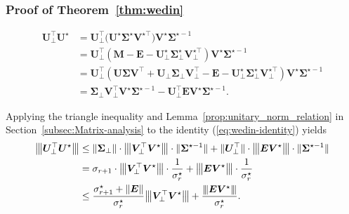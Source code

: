 \documentclass[compress,
mathserif,wide,%
]{beamer}
\begin{document}
\begin{frame}
	\frametitle{Proof of Theorem~\ref{thm:wedin}}
	
	
	\begin{align}
\bm{U}_{\perp}^{\top}\bm{U}^{\star}
	& =\bm{U}_{\perp}^{\top}\big(\bm{U}^{\star}\bm{\Sigma}^{\star}\bm{V}^{\star\top}\big)\bm{V}^{\star}\bm{\Sigma}^{\star-1}\nonumber \\
	& =\bm{U}_{\perp}^{\top}\left(\bm{M}-\bm{E}-\bm{U}_{\perp}^{\star}\bm{\Sigma}_{\perp}^{\star}\bm{V}_{\perp}^{\star\top}\right)\bm{V}^{\star}\bm{\Sigma}^{\star-1}\nonumber \\
 & =\bm{U}_{\perp}^{\top}\left(\bm{U}\bm{\Sigma}\bm{V}^{\top}+\bm{U}_{\perp}\bm{\Sigma}_{\perp}\bm{V}_{\perp}^{\top}-\bm{E}-\bm{U}_{\perp}^{\star}\bm{\Sigma}_{\perp}^{\star}\bm{V}_{\perp}^{\star\top}\right)\bm{V}^{\star}\bm{\Sigma}^{\star-1}\nonumber \\
 & =\bm{\Sigma}_{\perp}\bm{V}_{\perp}^{\top}\bm{V}^{\star}\bm{\Sigma}^{\star-1}-\bm{U}_{\perp}^{\top}\bm{E}\bm{V}^{\star}\bm{\Sigma}^{\star-1} .
	\label{eq:wedin-identity}
\end{align}

Applying the triangle inequality and Lemma~\ref{prop:unitary_norm_relation} in Section~\ref{subsec:Matrix-analysis} to the identity (\ref{eq:wedin-identity})
yields
%
\begin{align}
\vertiiibig{\bm{U}_{\perp}^{\top}\bm{U}^{\star}}
	& \leq \|\bm{\Sigma}_{\perp}\| \cdot \vertiiibig{\bm{V}_{\perp}^{\top}\bm{V}^{\star}} \cdot \|\bm{\Sigma}^{\star-1}\|
	 +  \| \bm{U}_{\perp}^{\top}\|\cdot \vertiiibig{\bm{E}\bm{V}^{\star}} \cdot \|\bm{\Sigma}^{\star-1}\| \notag\\
	 & =  \sigma_{r+1} \cdot \vertiiibig{\bm{V}_{\perp}^{\top}\bm{V}^{\star}} \cdot \frac{1}{\sigma_r^{\star}}
	 + \vertiiibig{\bm{E}\bm{V}^{\star}} \cdot \frac{1}{\sigma_r^{\star}}
	   \notag\\
 & \leq\frac{\sigma_{r+1}^{\star}+\|\bm{E}\|}{\sigma_{r}^{\star}}\vertiiibig{\bm{V}_{\perp}^{\top}\bm{V}^{\star}}+\frac{\vertiii{\bm{E}\bm{V}^{\star}}}{\sigma_{r}^{\star}}.
	\label{eq:Uperp-Ustar-UB}
\end{align}
\end{frame}
\end{document}
